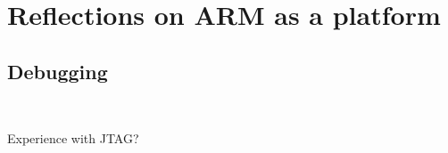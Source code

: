 \documentclass[a4paper,twoside]{report} %
\begin{document}
\chapter{Reflections on ARM as a platform}\label{chap:refl}

\section{Debugging}~\label{debugging}

Experience with JTAG?



\end{document}
